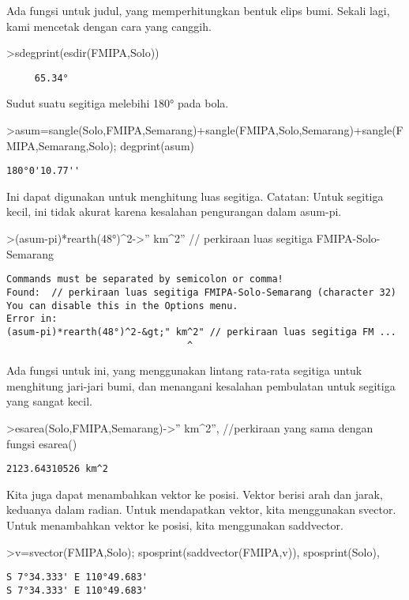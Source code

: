 \documentclass[
]{book}
\begin{document}
Ada fungsi untuk judul, yang memperhitungkan bentuk elips bumi. Sekali lagi, kami mencetak dengan cara yang canggih.

\textgreater sdegprint(esdir(FMIPA,Solo))

\begin{verbatim}
     65.34°
\end{verbatim}

Sudut suatu segitiga melebihi 180° pada bola.

\textgreater asum=sangle(Solo,FMIPA,Semarang)+sangle(FMIPA,Solo,Semarang)+sangle(FMIPA,Semarang,Solo); degprint(asum)

\begin{verbatim}
180°0'10.77''
\end{verbatim}

Ini dapat digunakan untuk menghitung luas segitiga. Catatan: Untuk segitiga kecil, ini tidak akurat karena kesalahan pengurangan dalam asum-pi.

\textgreater(asum-pi)*rearth(48°)\^{}2-\textgreater'' km\^{}2'' // perkiraan luas segitiga FMIPA-Solo-Semarang

\begin{verbatim}
Commands must be separated by semicolon or comma!
Found:  // perkiraan luas segitiga FMIPA-Solo-Semarang (character 32)
You can disable this in the Options menu.
Error in:
(asum-pi)*rearth(48°)^2-&gt;" km^2" // perkiraan luas segitiga FM ...
                                ^
\end{verbatim}

Ada fungsi untuk ini, yang menggunakan lintang rata-rata segitiga untuk menghitung jari-jari bumi, dan menangani kesalahan pembulatan untuk segitiga yang sangat kecil.

\textgreater esarea(Solo,FMIPA,Semarang)-\textgreater'' km\^{}2'', //perkiraan yang sama dengan fungsi esarea()

\begin{verbatim}
2123.64310526 km^2
\end{verbatim}

Kita juga dapat menambahkan vektor ke posisi. Vektor berisi arah dan jarak, keduanya dalam radian. Untuk mendapatkan vektor, kita menggunakan svector. Untuk menambahkan vektor ke posisi, kita menggunakan saddvector.

\textgreater v=svector(FMIPA,Solo); sposprint(saddvector(FMIPA,v)), sposprint(Solo),

\begin{verbatim}
S 7°34.333' E 110°49.683'
S 7°34.333' E 110°49.683'
\end{verbatim}
\end{document}
